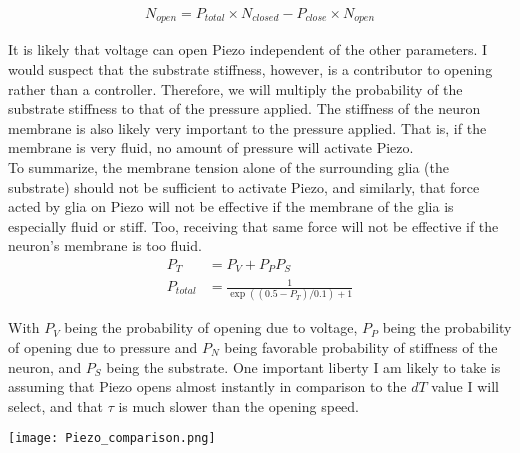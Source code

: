 \documentclass[12pt]{amsart}
\newcommand{\pr}[1]{\left(#1\right)}
\begin{document}
\bigskip

\begin{equation} \label{eq8}
\begin{split}
N_{open} = P_{total} \times N_{closed} - P_{close}\times N_{open}
\end{split}
\end{equation}

\bigskip

It is likely that voltage can open Piezo independent of the other parameters. I would suspect that the substrate stiffness, however, is a contributor to opening rather than a controller. Therefore, we will multiply the probability of the substrate stiffness to that of the pressure applied. The stiffness of the neuron membrane is also likely very important to the pressure applied. That is, if the membrane is very fluid, no amount of pressure will activate Piezo. \\

To summarize, the membrane tension alone of the surrounding glia (the substrate) should not be sufficient to activate Piezo, and similarly, that force acted by glia on Piezo will not be effective if the membrane of the glia is especially fluid or stiff. Too, receiving that same force will not be effective if the neuron's membrane is too fluid. \\

\begin{equation} \label{eq8}
\begin{split}
P_T & = P_V + P_PP_S\\
P_{total} & = \frac{1}{\exp\pr{\pr{0.5 - P_{T}}/0.1} + 1}
\end{split}
\end{equation}

\bigskip

With $P_V$ being the probability of opening due to voltage, $P_P$ being the probability of opening due to pressure and $P_N$ being favorable probability of stiffness of the neuron, and $P_S$ being the substrate. One important liberty I am likely to take is assuming that Piezo opens almost instantly in comparison to the $dT$ value I will select, and that $\tau$ is much slower than the opening speed.\newline



\begin{center}
\texttt{[image: Piezo\_comparison.png]}
\end{center}
\end{document}
